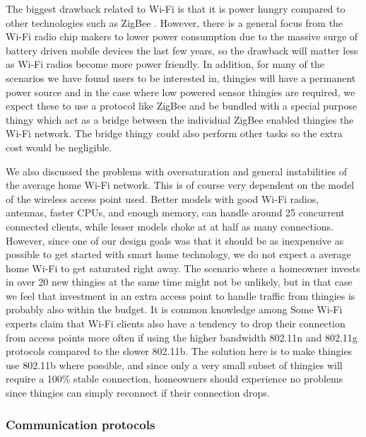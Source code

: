 \documentclass{ubicomp2012}
\begin{document}
The biggest drawback related to Wi-Fi is that it is power hungry compared to other technologies such as ZigBee \cite{zigbeeWebsite}. However, there is a general focus from the Wi-Fi radio chip makers to lower power consumption due to the massive surge of battery driven mobile devices the last few years, so the drawback will matter less as Wi-Fi radios become more power friendly. In addition, for many of the scenarios we have found users to be interested in, thingies will have a permanent power source and in the case where low powered sensor thingies are required, we expect these to use a protocol like ZigBee\cite{zigbeeWebsite} and be bundled with a special purpose thingy which act as a bridge between the individual ZigBee enabled thingies the Wi-Fi network. The bridge thingy could also perform other tasks so the extra cost would be negligible.

We also discussed the problems with oversaturation and general instabilities of the average home Wi-Fi network. This is of course very dependent on the model of the wireless access point used. Better models with good Wi-Fi radios, antennas, faster CPUs, and enough memory, can handle around 25 concurrent connected clients, while lesser models choke at at half as many connections. However, since one of our design goals was that it should be as inexpensive as possible to get started with smart home technology, we do not expect a average home Wi-Fi to get saturated right away. The scenario where a homeowner invests in over 20 new thingies at the same time might not be unlikely, but in that case we feel that investment in an extra access point to handle traffic from thingies is probably also within the budget. It is common knowledge among Some Wi-Fi experts claim that Wi-Fi clients also have a tendency to drop their connection from access points more often if using the higher bandwidth 802.11n and 802.11g protocols compared to the slower 802.11b. The solution here is to make thingies use 802.11b where possible, and since only a very small subset of thingies will require a 100\% stable connection, homeowners should experience no problems since thingies can simply reconnect if their connection drops.
\subsubsection{Communication protocols}
\end{document}
